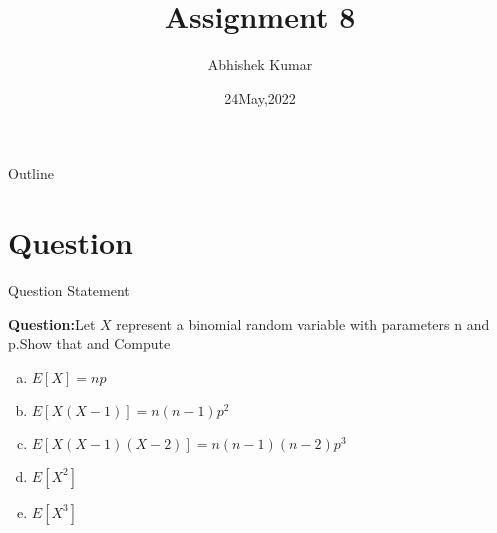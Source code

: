 \documentclass{beamer}
\title{Assignment 8}
\author{Abhishek Kumar}
\institute{IIT Hyderabad}
\date{24May,2022}
\begin{document}
	\begin{frame}
		\titlepage
	\end{frame}
	\begin{frame}{Outline}
		\tableofcontents
	\end{frame}
	\section{Question}
	\begin{frame}{Question Statement}
		
		\textbf{Question:}Let $X$ represent a binomial random variable with parameters n and p.Show that and Compute
		\begin{enumerate}[(a)]
			\item $E[X]=np$
			\item $E[X(X-1)]=n(n-1)p^{2}$
			\item $E[X(X-1)(X-2)]=n(n-1)(n-2)p^{3}$
			\item $E[X^{2}]$
			\item $E[X^{3}]$
		\end{enumerate}
	\end{frame}
\end{document}
